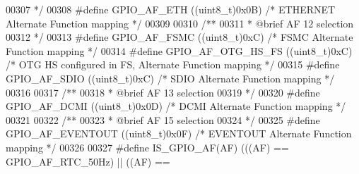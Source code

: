 \begin{DoxyCode}
00307 \textcolor{comment}{  */}
00308 \textcolor{preprocessor}{#}\textcolor{preprocessor}{define} \textcolor{preprocessor}{GPIO\_AF\_ETH}             \textcolor{preprocessor}{(}\textcolor{preprocessor}{(}\textcolor{preprocessor}{uint8\_t}\textcolor{preprocessor}{)}0x0B\textcolor{preprocessor}{)}  \textcolor{comment}{/* ETHERNET Alternate Function mapping */}
00309 
00310 \textcolor{comment}{/** }
00311 \textcolor{comment}{  * @brief   AF 12 selection  }
00312 \textcolor{comment}{  */}
00313 \textcolor{preprocessor}{#}\textcolor{preprocessor}{define} \textcolor{preprocessor}{GPIO\_AF\_FSMC}            \textcolor{preprocessor}{(}\textcolor{preprocessor}{(}\textcolor{preprocessor}{uint8\_t}\textcolor{preprocessor}{)}0xC\textcolor{preprocessor}{)}  \textcolor{comment}{/* FSMC Alternate Function mapping */}
00314 \textcolor{preprocessor}{#}\textcolor{preprocessor}{define} \textcolor{preprocessor}{GPIO\_AF\_OTG\_HS\_FS}       \textcolor{preprocessor}{(}\textcolor{preprocessor}{(}\textcolor{preprocessor}{uint8\_t}\textcolor{preprocessor}{)}0xC\textcolor{preprocessor}{)}  \textcolor{comment}{/* OTG HS configured in FS, Alternate Function mapping
       */}
00315 \textcolor{preprocessor}{#}\textcolor{preprocessor}{define} \textcolor{preprocessor}{GPIO\_AF\_SDIO}            \textcolor{preprocessor}{(}\textcolor{preprocessor}{(}\textcolor{preprocessor}{uint8\_t}\textcolor{preprocessor}{)}0xC\textcolor{preprocessor}{)}  \textcolor{comment}{/* SDIO Alternate Function mapping */}
00316 
00317 \textcolor{comment}{/** }
00318 \textcolor{comment}{  * @brief   AF 13 selection  }
00319 \textcolor{comment}{  */}
00320 \textcolor{preprocessor}{#}\textcolor{preprocessor}{define} \textcolor{preprocessor}{GPIO\_AF\_DCMI}          \textcolor{preprocessor}{(}\textcolor{preprocessor}{(}\textcolor{preprocessor}{uint8\_t}\textcolor{preprocessor}{)}0x0D\textcolor{preprocessor}{)}  \textcolor{comment}{/* DCMI Alternate Function mapping */}
00321 
00322 \textcolor{comment}{/** }
00323 \textcolor{comment}{  * @brief   AF 15 selection  }
00324 \textcolor{comment}{  */}
00325 \textcolor{preprocessor}{#}\textcolor{preprocessor}{define} \textcolor{preprocessor}{GPIO\_AF\_EVENTOUT}      \textcolor{preprocessor}{(}\textcolor{preprocessor}{(}\textcolor{preprocessor}{uint8\_t}\textcolor{preprocessor}{)}0x0F\textcolor{preprocessor}{)}  \textcolor{comment}{/* EVENTOUT Alternate Function mapping */}
00326 
00327 \textcolor{preprocessor}{#}\textcolor{preprocessor}{define} \textcolor{preprocessor}{IS\_GPIO\_AF}\textcolor{preprocessor}{(}\textcolor{preprocessor}{AF}\textcolor{preprocessor}{)}   \textcolor{preprocessor}{(}\textcolor{preprocessor}{(}\textcolor{preprocessor}{(}\textcolor{preprocessor}{AF}\textcolor{preprocessor}{)} \textcolor{preprocessor}{==} GPIO_AF_RTC_50Hz\textcolor{preprocessor}{)}  \textcolor{preprocessor}{||} \textcolor{preprocessor}{(}\textcolor{preprocessor}{(}\textcolor{preprocessor}{AF}\textcolor{preprocessor}{)} \textcolor{preprocessor}{==} 

\end{DoxyCode}
